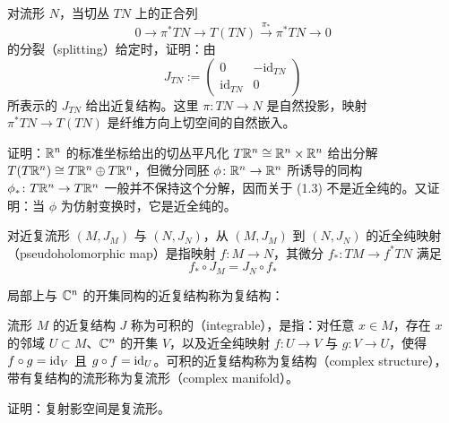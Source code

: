 
\begin{exercise}
对流形 $N$，当切丛 $TN$ 上的正合列
\begin{equation}
    0 \to \pi^*TN \to T(TN) \xrightarrow{\pi_*} \pi^*TN \to 0 \tag{1.2}
\end{equation}
的分裂（splitting）给定时，证明：由
\begin{equation}
    J_{TN} := \begin{pmatrix} 0 & -\mathrm{id}_{TN} \\ \mathrm{id}_{TN} & 0 \end{pmatrix} \tag{1.3}
\end{equation}
所表示的 $J_{TN}$ 给出近复结构。这里 $\pi\colon TN\to N$ 是自然投影，映射 $\pi^*TN\to T(TN)$ 是纤维方向上切空间的自然嵌入。
\end{exercise}

\begin{exercise}
证明：$\mathbb{R}^n$ 的标准坐标给出的切丛平凡化 $T\mathbb{R}^n\cong\mathbb{R}^n\times\mathbb{R}^n$ 给出分解 $T(T\mathbb{R}^n)\cong T\mathbb{R}^n\oplus T\mathbb{R}^n$，但微分同胚 $\phi\colon\mathbb{R}^n\to\mathbb{R}^n$ 所诱导的同构 $\phi_*\colon T\mathbb{R}^n\to T\mathbb{R}^n$ 一般并不保持这个分解，因而关于 (1.3) 不是近全纯的。又证明：当 $\phi$ 为仿射变换时，它是近全纯的。
\end{exercise}

\begin{definition}
对近复流形 $(M,J_M)$ 与 $(N,J_N)$，从 $(M,J_M)$ 到 $(N,J_N)$ 的近全纯映射（pseudoholomorphic map）是指映射 $f\colon M\to N$，其微分 $f_*\colon TM\to f^*TN$ 满足
\begin{equation}
    f_*\circ J_M = J_N\circ f_* \tag{1.4}
\end{equation}
\end{definition}

局部上与 $\mathbb{C}^n$ 的开集同构的近复结构称为复结构：

\begin{definition}
流形 $M$ 的近复结构 $J$ 称为可积的（integrable），是指：对任意 $x\in M$，存在 $x$ 的邻域 $U\subset M$、$\mathbb{C}^n$ 的开集 $V$，以及近全纯映射 $f\colon U\to V$ 与 $g\colon V\to U$，使得 $f\circ g=\mathrm{id}_V$ 且 $g\circ f=\mathrm{id}_U$。可积的近复结构称为复结构（complex structure），带有复结构的流形称为复流形（complex manifold）。
\end{definition}

\begin{exercise}
证明：复射影空间是复流形。
\end{exercise}

